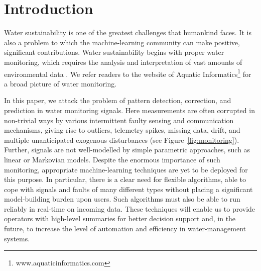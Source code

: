 \documentclass{article}
\begin{document}
\section{Introduction}

Water sustainability is one of the greatest challenges that humankind
faces. It is also a problem to which the machine-learning community
can make positive, significant contributions. Water sustainability
begins with proper water monitoring, which requires the analysis and
interpretation of vast amounts of environmental data
\citep{wagner2006guidelines}. We refer readers to the website of Aquatic Informatics\footnote{www.aquaticinformatics.com} for a broad picture of water monitoring. 

In this paper, we attack the problem of
pattern detection, correction, and prediction in water monitoring
signals.  Here measurements are often corrupted in non-trivial ways by
various intermittent faulty sensing and communication mechanisms,
giving rise to outliers, telemetry spikes, missing data, drift, and
multiple unanticipated exogenous disturbances (see
Figure~\ref{fig:monitoring}).  Further, signals are not well-modelled
by simple parametric approaches, such as linear or Markovian
models. Despite the enormous importance of such monitoring,
appropriate machine-learning techniques are yet to be deployed for
this purpose. In particular, there is a clear need for flexible
algorithms, able to cope with signals and faults of many different
types without placing a significant model-building burden upon
users. Such algorithms must also be able to run reliably in real-time
on incoming data.
These techniques will enable us to provide operators with high-level
summaries for better decision support and, in the future, to increase
the level of automation and efficiency in water-management systems.
\end{document}
